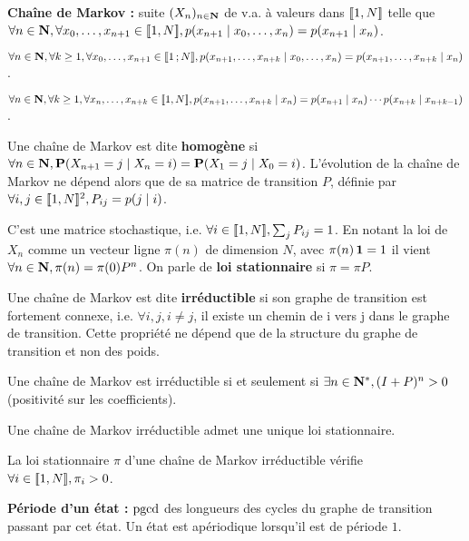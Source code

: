 \begin{defn}
	\textbf{Chaîne de Markov :} suite $(X_n)_{n \in \mathbf{N}}$ de v.a. à valeurs dans $[\![ 1,N ]\!]$ telle que $\forall n \in \mathbf{N}, \forall x_0,\ldots,x_{n+1} \in [\![ 1,N ]\!], p(x_{n+1} \mid x_0,\ldots,x_n) = p(x_{n+1} \mid x_n)$.
\end{defn}

\begin{pop}
	$\forall n \in \mathbf{N}, \forall k \geq 1, \forall x_0,\ldots,x_{n+1} \in \mathopen{}\mathclose{\left[\![1\mathclose{}\mathpunct{};N\right]\!]}, p(x_{n+1},\ldots,x_{n+k} \mid x_0,\ldots,x_n) = p(x_{n+1},\ldots,x_{n+k} \mid x_n)$.
\end{pop}

\begin{pop}
	$\forall n \in \mathbf{N}, \forall k \geq 1, \forall x_n,\ldots,x_{n+k} \in [\![ 1,N ]\!], p(x_{n+1},\ldots,x_{n+k} \mid x_n) = p(x_{n+1} \mid x_n) \cdots p(x_{n+k} \mid x_{n+k-1})$.
\end{pop}

\begin{defn}
	Une chaîne de Markov est dite \textbf{homogène} si $\forall n \in \mathbf{N}, \mathbf{P}(X_{n+1} = j \mid X_n = i) = \mathbf{P}(X_1 = j \mid X_0 = i)$.
	L'évolution de la chaîne de Markov ne dépend alors que de sa matrice de transition $P$, définie par $\forall i,j \in [\![ 1,N ]\!]^2, P_{ij} = p(j \mid i)$.
\end{defn}

C'est une matrice stochastique, i.e. $\forall i \in [\![ 1,N ]\!], \sum_j P_{ij} = 1$.
En notant la loi de $X_n$ comme un vecteur ligne $\pi(n)$ de dimension $N$, avec $\pi(n)\operatorname{\mathbf{1}} = 1$ il vient $\forall n \in \mathbf{N}, \pi(n) = \pi(0) P^n$.
On parle de \textbf{loi stationnaire} si $\pi = \pi P$.

\begin{defn}
	Une chaîne de Markov est dite \textbf{irréductible} si son graphe de transition est fortement connexe, i.e. $\forall i,j, i \neq j$, il existe un chemin de i vers j dans le graphe de transition.
	Cette propriété ne dépend que de la structure du graphe de transition et non des poids.
\end{defn}

\begin{pop}
	Une chaîne de Markov est irréductible si et seulement si $\exists n \in \mathbf{N}^*, (I + P)^n > 0$ (positivité sur les coefficients).
\end{pop}

\begin{thm}
	Une chaîne de Markov irréductible admet une unique loi stationnaire.
\end{thm}

\begin{cor}
	La loi stationnaire $\pi$ d'une chaîne de Markov irréductible vérifie $\forall i \in [\![ 1,N ]\!], \pi_i > 0$.
\end{cor}

\begin{defn}
	\textbf{Période d'un état :} $\operatorname{pgcd}$ des longueurs des cycles du graphe de transition passant par cet état. Un état est apériodique lorsqu'il est de période $1$.
\end{defn}